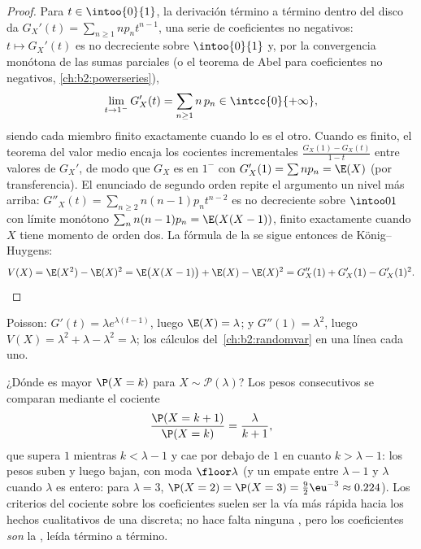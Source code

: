 \begin{proof}
Para $t \in \intoo{0}{1}$, la derivación término a término dentro del
disco da $G_X'(t) = \sum_{n\geq1} np_n t^{n-1}$, una serie de
coeficientes no negativos: $t \mapsto G_X'(t)$ es no decreciente
sobre $\intoo{0}{1}$ y, por la convergencia monótona de las sumas
parciales (o el teorema de Abel para coeficientes no negativos,
\cref{ch:b2:powerseries}),
\[
\lim_{t \to 1^-} G_X'(t)
= \sum_{n\geq1} n\,p_n \in \intcc{0}{+\infty} ,
\]
siendo cada miembro finito exactamente cuando lo es el otro. Cuando
es finito, el teorema del valor medio encaja los cocientes
incrementales $\frac{G_X(1) - G_X(t)}{1 - t}$ entre valores de
$G_X'$, de modo que $G_X$ es  en $1^-$ con $G_X'(1) =
\sum np_n = \E(X)$ (por transferencia). El enunciado de segundo orden
repite el argumento un nivel más arriba: $G''_X(t) =
\sum_{n\geq2}n(n-1)p_nt^{n-2}$ es no decreciente sobre $\intoo01$ con
límite monótono $\sum_nn(n-1)p_n = \E(X(X-1))$, finito exactamente
cuando $X$ tiene momento de orden dos. La fórmula de la  se
sigue entonces de König--Huygens:
\[
V(X) = \E(X^2) - \E(X)^2 = \E\bigl(X(X-1)\bigr) + \E(X) -
\E(X)^2 = G''_X(1) + G'_X(1) - G'_X(1)^2 .
\]
\end{proof}

\begin{example}
Poisson: $G'(t) = \lambda e^{\lambda(t-1)}$, luego $\E(X) = \lambda$;
y $G''(1) = \lambda^2$, luego $V(X) = \lambda^2 + \lambda - \lambda^2
= \lambda$; los cálculos del~\cref{ch:b2:randomvar} en una línea cada
uno.
\end{example}

\begin{example}
\label{ex:b2:genfun:poissonmode}
¿Dónde es mayor $\P(X = k)$ para $X \sim \mathcal P(\lambda)$? Los
pesos consecutivos se comparan mediante el cociente
\[
\frac{\P(X = k+1)}{\P(X = k)} = \frac{\lambda}{k + 1} ,
\]
que supera $1$ mientras $k < \lambda - 1$ y cae por debajo de $1$ en
cuanto $k > \lambda - 1$: los pesos suben y luego bajan, con moda
$\floor\lambda$ (y un empate entre $\lambda - 1$ y $\lambda$ cuando
$\lambda$ es entero: para $\lambda = 3$, $\P(X = 2) = \P(X = 3) =
\frac92\eu^{-3} \approx 0.224$). Los criterios del cociente sobre los
coeficientes suelen ser la vía más rápida hacia los hechos
cualitativos de una  discreta; no hace falta ninguna
, pero los coeficientes \emph{son} la
, leída término a término.
\end{example}

